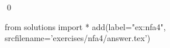 
\begin{ex} 
  \label{ex:nfa4}
  
  \qed
\end{ex} 
\begin{python0}
from solutions import *
add(label="ex:nfa4",
    srcfilename='exercises/nfa4/answer.tex') 
\end{python0}

